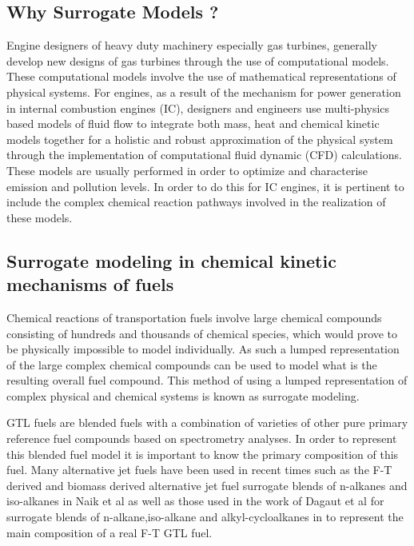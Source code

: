 \subsection{Why Surrogate Models ?}
Engine designers of heavy duty machinery especially gas turbines, generally develop new designs of gas turbines through the use of computational models\cite{Mehl2012ModelingApproach}. These computational models involve the use of mathematical representations of physical systems. For engines, as a result of the mechanism for power generation in internal combustion engines (IC), designers and engineers use multi-physics based models of fluid flow to integrate both mass, heat and chemical kinetic models together for a holistic and robust approximation of the physical system through the implementation of computational fluid dynamic (CFD) calculations. These models are usually performed in order to optimize and characterise emission and pollution levels. In order to do this for IC engines, it is pertinent to include the complex chemical reaction pathways involved in the realization of these models. 

\subsection{Surrogate modeling in chemical kinetic mechanisms of fuels}
Chemical reactions of transportation fuels involve large chemical compounds consisting of hundreds and thousands of chemical species, which would prove to be physically impossible to model individually. As such a lumped representation of the large complex chemical compounds can be used to model what is the resulting overall fuel compound. This method of using a lumped representation of complex physical and chemical systems is known as surrogate modeling. 

GTL fuels are blended fuels with a combination of varieties of other pure primary reference fuel compounds based on spectrometry analyses. In order to represent this blended fuel model it is important to know the primary composition of this fuel. Many alternative jet fuels have been used in recent times such as the F-T derived and biomass derived alternative jet fuel surrogate blends of n-alkanes and iso-alkanes in Naik et al\cite{Naik2011DetailedFuels} as well as those used in the work of Dagaut et al for surrogate blends of n-alkane,iso-alkane and alkyl-cycloalkanes in \cite{Dagaut2014} to represent the main composition of a real F-T GTL fuel. 


